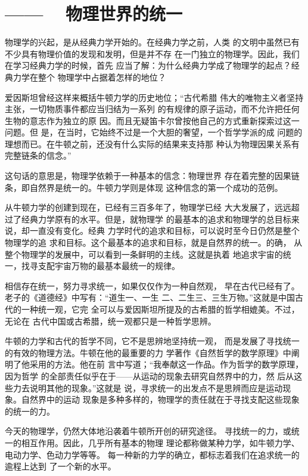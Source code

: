\chapter{—— ~ 物理世界的统一}\label{chp:0}

物理学的兴起，是从经典力学开始的。在经典力学之前，人类
的文明中虽然已有不少具有物理价值的发现和发明，但是并不存
在一门独立的物理学。因此，我们在学习经典力学的时候，首先
应当了解：为什么经典力学成了物理学的起点？经典力学在整个
物理学中占据着怎样的地位？

爱因斯坦曾经这样来概括牛顿力学的历史地位；“古代希腊
伟大的唯物主义者坚持主张，一切物质事件都应当归结为一系列
的有规律的原子运动，而不允许把任何生物的意志作为独立的原
因。而且无疑笛卡尔曾按他自己的方式重新探索过这一问题。但
是，在当时，它始终不过是一个大胆的奢望，一个哲学学派的成
问题的理想而已。在牛顿之前，还没有什么实际的结果来支持那
种认为物理因果关系有完整链条的信念。”

这句话的意思是，物理学依赖于一种基本的信念：物理世界
存在着完整的因果链条，即自然界是统一的。牛顿力学则是体现
这种信念的第一个成功的范例。

从牛顿力学的创建到现在，已经有三百多年了，物理学已经
大大发展了，远远超过了经典力学原有的水平。但是，就物理学
的最基本的追求和物理学的总目标来说，却一直没有变化。经典
力学时代的追求和目标，可以说时至今日仍然是整个物理学的追
求和目标。这个最基本的追求和目标，就是自然界的统一。的确，
从整个物理学的发展中，可以看到一条鲜明的主线。这就是执着%
地追求宇宙的统一，找寻支配宇宙万物的最基本最统一的规律。

相信存在统一，努力寻求统一，如果仅仅作为一种自然观，
早在古代已经有了。老子的《道德经》中写有：“道生一、一生
二、二生三、三生万物。”这就是中国古代的一种统一观，它完
全可以与爱因斯坦所提及的古希腊的哲学相媲美。不过，无论在
古代中国或古希腊，统一观都只是一种哲学思辨。

牛顿的力学和古代的哲学不同，它不是思辨地坚持统一观，
而是发展了寻找统一的有效的物理方法。牛顿在他的最重要的力
学著作《自然哲学的数学原理》中阐明了他采用的方法。他在前
言中写道；“我奉献这一作品。作为哲学的数学原理，因为哲学
的全部责任似乎在于——从运动的现象去研究自然界中的力，然
后从这些力去说明其他的现象。”这就是
说，寻求统一的出发点不是思辨而应是运动现象。自然界中的运动
现象是多种多样的，物理学的责任就在于寻找支配这些现象的统一的力。

今天的物理学，仍然大体地沿袭着牛顿所开创的研究途径。
寻找统一的力，或统一的相互作用。因此，几乎所有基本的物理
理论都称做某种力学，如牛顿力学、电动力学、色动力学等等。
每一种新的力学的确立，都标志着我们在追求统一的逾程上达到
了一个新的水平。

